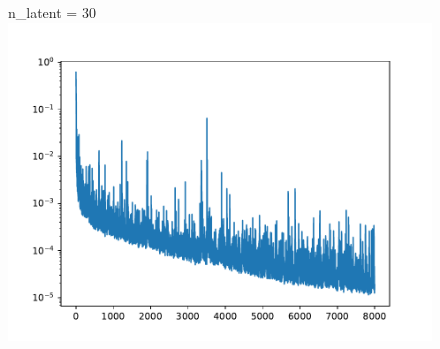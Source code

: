 \documentclass[USenglish]{article}
\newcommand{\1}{\begin{pmatrix}
		1\\
		1
\end{pmatrix}}
\begin{document}
\begin{figure}
	\begin{minipage}{0.32\textwidth}
	\centering
	n\_latent = 30\\
	\includegraphics[width=\textwidth, trim={20 0 45 30}, clip]{loss_convAE_trial_001_batch_004_n_dense_030.pdf}
\end{minipage}\\


\end{figure}
\end{document}
